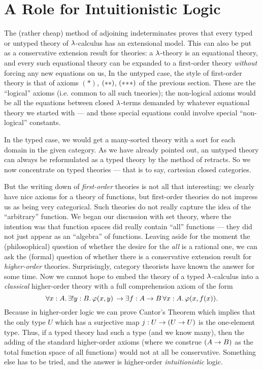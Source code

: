 \section{A Role for Intuitionistic Logic}

The (rather cheap) method of adjoining indeterminates proves that every typed or untyped
theory of $\l$-calculus has an extensional model. This can also be put as a conservative
extension result for theories: a $\l$-theory is an equational theory, and every such
equational theory can be expanded to a first-order theory {\it without} forcing any new
equations on us,  In the untyped case, the style of first-order theory is that of axioms
$(*)$, $\ss$, $\sss$ of the previous section. These are the ``logical'' axioms (i.e.
common to all such tneories); the non-logical axioms would be all the equations between
closed $\l$-terms demanded by whatever equational theory we started with --- and these
special equations could involve special ``non-logical'' constants.

In the typed case, we would get a many-sorted theory with a sort for each domain in the
given category. As we have already pointed out, an untyped theory can always be
reformulated as a typed theory by the method of retracts. So we now concentrate on typed
theories --- that is to say, cartesian closed categories.

But the writing down of {\it first-order} theories is not all that interesting: we clearly
have nice axioms for a theory of functions, but first-order theories do not impress us as
being very categorical. Such theories do not really capture the idea of the ``arbitrary''
function. We began our discussion with set theory, where the intention was that function
spaces did really contain ``all'' functions --- they did not just appear as an ``algebra''
of functions. Leaving aside for the moment the (philosophical) question of whether the
desire for the {\it all} is a rational one, we can ask the (formal) question of whether
there is a conservative extension result for {\it higher-order} theories. Surprisingly,
category theorists have known the answer for some time. Now we cannot hope to embed the
theory of a typed $\l$-calculus into a {\it classical} higher-order theory with a full
comprehension axiom of the form
$$
\forall x:A .\, \exists !y: B .\,  \ffam(x,y)  \, \to  \exists f: \AB \, \forall x: A .\, \ffam(x,f(x)).
$$
Because in higher-order logic we can prove Cantor's Theorem which implies that the only
type $U$ which has a surjective map $j : U \to \UU$ is the one-element type. Thus, if a
typed theory had such a type (and we know many), then the adding of the standard
higher-order axioms (where we construe $(\AB)$ as the total function space of all
functions) would not at all be conservative. Something else has to be tried, and the
answer is higher-order {\it intuitionistic} logic.

